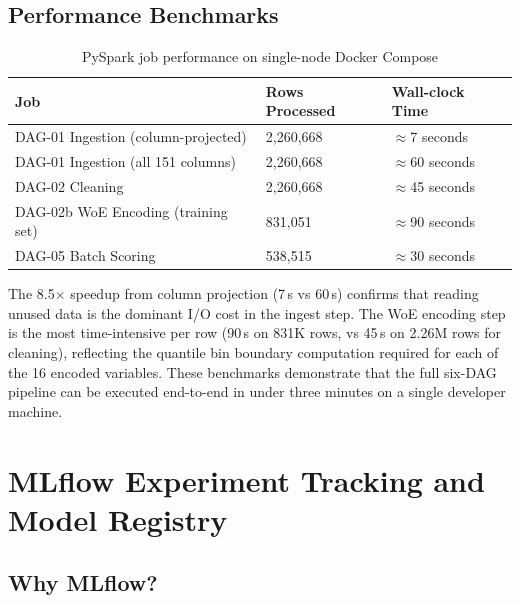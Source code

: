 \documentclass[12pt,a4paper]{report}
\begin{document}
\section{Performance Benchmarks}

\begin{table}[H]
\centering
\caption{PySpark job performance on single-node Docker Compose}
\label{tab:perf}
\begin{tabular}{lll}
\toprule
\textbf{Job} & \textbf{Rows Processed} & \textbf{Wall-clock Time} \\
\midrule
DAG-01 Ingestion (column-projected) & 2,260,668 & $\approx$7 seconds \\
DAG-01 Ingestion (all 151 columns)  & 2,260,668 & $\approx$60 seconds \\
DAG-02 Cleaning                     & 2,260,668 & $\approx$45 seconds \\
DAG-02b WoE Encoding (training set) & 831,051   & $\approx$90 seconds \\
DAG-05 Batch Scoring                & 538,515   & $\approx$30 seconds \\
\bottomrule
\end{tabular}
\end{table}

\medskip
\noindent The 8.5$\times$ speedup from column projection (7\,s vs 60\,s) confirms that reading unused data is the dominant I/O cost in the ingest step. The WoE encoding step is the most time-intensive per row (90\,s on 831K rows, vs 45\,s on 2.26M rows for cleaning), reflecting the quantile bin boundary computation required for each of the 16 encoded variables. These benchmarks demonstrate that the full six-DAG pipeline can be executed end-to-end in under three minutes on a single developer machine.

\chapter{MLflow Experiment Tracking and Model Registry}
\label{ch:mlflow}

\section{Why MLflow?}
\end{document}
